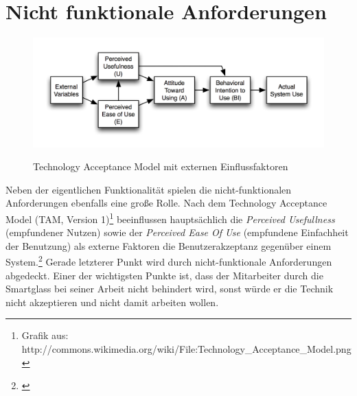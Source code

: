 \section{Nicht funktionale Anforderungen}

\begin{figure}[H]
	\centering
	{\includegraphics[width=\textwidth]{Bilder/Abbildungen/Technology_Acceptance_Model.png}}
	\caption{Technology Acceptance Model mit externen Einflussfaktoren} 
	\label{fig:tam}
\end{figure}

Neben der eigentlichen Funktionalität spielen die nicht-funktionalen Anforderungen ebenfalls eine große Rolle. Nach dem Technology Acceptance Model (TAM, Version 1)\footnote{Grafik aus: http://commons.wikimedia.org/wiki/File:Technology\_Acceptance\_Model.png} beeinflussen hauptsächlich die \emph{Perceived Usefullness} (empfundener Nutzen) sowie der \emph{Perceived Ease Of Use} (empfundene Einfachheit der Benutzung) als externe Faktoren die Benutzerakzeptanz gegenüber einem System.\footnote{\citep{tam}} Gerade letzterer Punkt wird durch nicht-funktionale Anforderungen abgedeckt. Einer der wichtigsten Punkte ist, dass der Mitarbeiter durch die Smartglass bei seiner Arbeit nicht behindert wird, sonst würde er die Technik nicht akzeptieren und nicht damit arbeiten wollen.\\

